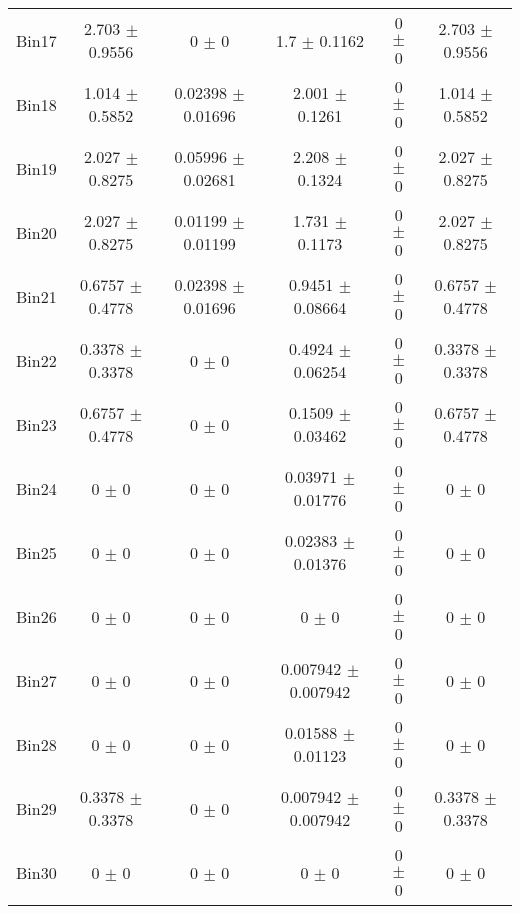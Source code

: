 \begin{tabular}{@{\extracolsep{4pt}}lccccc@{}}
     Bin17 & 2.703 $\pm$ 0.9556 & 0 $\pm$ 0 & 1.7 $\pm$ 0.1162 & 0 $\pm$ 0 & 2.703 $\pm$ 0.9556 \\ 
     Bin18 & 1.014 $\pm$ 0.5852 & 0.02398 $\pm$ 0.01696 & 2.001 $\pm$ 0.1261 & 0 $\pm$ 0 & 1.014 $\pm$ 0.5852 \\ 
     Bin19 & 2.027 $\pm$ 0.8275 & 0.05996 $\pm$ 0.02681 & 2.208 $\pm$ 0.1324 & 0 $\pm$ 0 & 2.027 $\pm$ 0.8275 \\ 
     Bin20 & 2.027 $\pm$ 0.8275 & 0.01199 $\pm$ 0.01199 & 1.731 $\pm$ 0.1173 & 0 $\pm$ 0 & 2.027 $\pm$ 0.8275 \\ 
     Bin21 & 0.6757 $\pm$ 0.4778 & 0.02398 $\pm$ 0.01696 & 0.9451 $\pm$ 0.08664 & 0 $\pm$ 0 & 0.6757 $\pm$ 0.4778 \\ 
     Bin22 & 0.3378 $\pm$ 0.3378 & 0 $\pm$ 0 & 0.4924 $\pm$ 0.06254 & 0 $\pm$ 0 & 0.3378 $\pm$ 0.3378 \\ 
     Bin23 & 0.6757 $\pm$ 0.4778 & 0 $\pm$ 0 & 0.1509 $\pm$ 0.03462 & 0 $\pm$ 0 & 0.6757 $\pm$ 0.4778 \\ 
     Bin24 & 0 $\pm$ 0 & 0 $\pm$ 0 & 0.03971 $\pm$ 0.01776 & 0 $\pm$ 0 & 0 $\pm$ 0 \\ 
     Bin25 & 0 $\pm$ 0 & 0 $\pm$ 0 & 0.02383 $\pm$ 0.01376 & 0 $\pm$ 0 & 0 $\pm$ 0 \\ 
     Bin26 & 0 $\pm$ 0 & 0 $\pm$ 0 & 0 $\pm$ 0 & 0 $\pm$ 0 & 0 $\pm$ 0 \\ 
     Bin27 & 0 $\pm$ 0 & 0 $\pm$ 0 & 0.007942 $\pm$ 0.007942 & 0 $\pm$ 0 & 0 $\pm$ 0 \\ 
     Bin28 & 0 $\pm$ 0 & 0 $\pm$ 0 & 0.01588 $\pm$ 0.01123 & 0 $\pm$ 0 & 0 $\pm$ 0 \\ 
     Bin29 & 0.3378 $\pm$ 0.3378 & 0 $\pm$ 0 & 0.007942 $\pm$ 0.007942 & 0 $\pm$ 0 & 0.3378 $\pm$ 0.3378 \\ 
     Bin30 & 0 $\pm$ 0 & 0 $\pm$ 0 & 0 $\pm$ 0 & 0 $\pm$ 0 & 0 $\pm$ 0 \\ 
\hline\hline
  \end{tabular}
